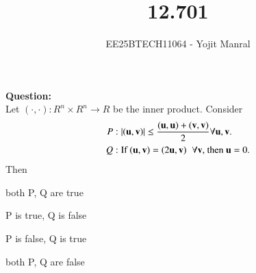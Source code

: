 \documentclass[journal]{IEEEtran}
\begin{document}

\vspace{3cm}

\title{12.701}
\author{EE25BTECH11064 - Yojit Manral}

\maketitle
{\let\newpage\relax\maketitle}
\renewcommand{\thefigure}{\theenumi}
\renewcommand{\thetable}{\theenumi}
\setlength{\intextsep}{10pt} %

\textbf{Question:}\\
Let $ (\cdot, \cdot) : R^n \times R^n \rightarrow R $ be the inner product. Consider
\begin{align*}
    P &: |(\vec{u}, \vec{v})| \leq \frac{(\vec{u}, \vec{u})+(\vec{v}, \vec{v})}{2} \forall \vec{u}, \vec{v}. \\
    Q &: \text{If }(\vec{u}, \vec{v}) = (2\vec{u}, \vec{v}) \hspace{0.2cm} \forall \vec{v} \text{, then }\vec{u} = 0.
\end{align*}
Then
\begin{enumerate}[label=(\alph*)]
\begin{multicols}{2}
    \item both P, Q are true
    \item P is true, Q is false
    \item P is false, Q is true
    \item both P, Q are false
\end{multicols}
\end{enumerate}
\end{document}
